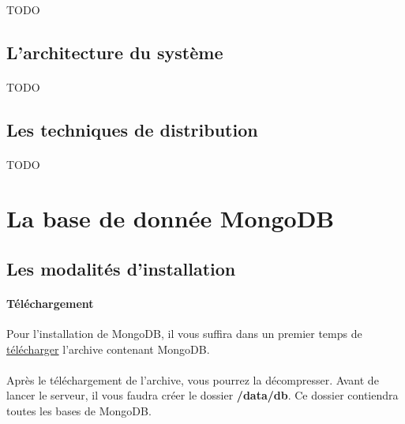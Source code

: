 \documentclass{article}
\begin{document}
  \paragraph{} TODO
\subsection{L’architecture du système}
  \paragraph{} TODO
\subsection{Les techniques de distribution}
  \paragraph{} TODO
  
  
  
\newpage
\section{La base de donnée MongoDB}
\subsection{Les modalités d’installation}
  \paragraph{Téléchargement} Pour l'installation de MongoDB, il vous suffira
  dans un premier temps de \href{https://www.mongodb.com/download-center#community}{télécharger} 
  l'archive contenant MongoDB.
  \paragraph{} Après le téléchargement de l'archive, vous pourrez la décompresser. Avant
  de lancer le serveur, il vous faudra créer le dossier \textbf{/data/db}. Ce dossier
  contiendra toutes les bases de MongoDB.
\end{document}
